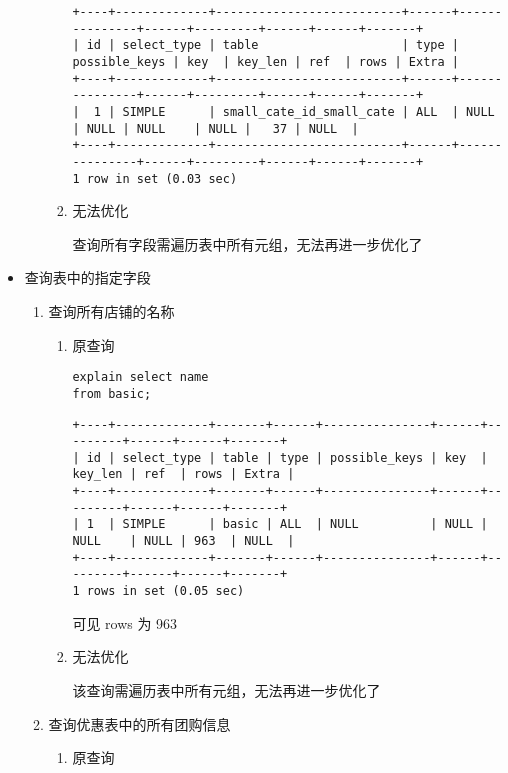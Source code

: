 \documentclass[11pt]{article}
\begin{document}
\begin{itemize}
\begin{enumerate}
\begin{enumerate}
\begin{verbatim}
+----+-------------+--------------------------+------+---------------+------+---------+------+------+-------+
| id | select_type | table                    | type | possible_keys | key  | key_len | ref  | rows | Extra |
+----+-------------+--------------------------+------+---------------+------+---------+------+------+-------+
|  1 | SIMPLE      | small_cate_id_small_cate | ALL  | NULL          | NULL | NULL    | NULL |   37 | NULL  |
+----+-------------+--------------------------+------+---------------+------+---------+------+------+-------+
1 row in set (0.03 sec)
\end{verbatim}

\item 无法优化

查询所有字段需遍历表中所有元组，无法再进一步优化了
\end{enumerate}
\end{enumerate}
\item 查询表中的指定字段
\label{sec-3-2-1-2}
\begin{enumerate}
\item 查询所有店铺的名称
\begin{enumerate}
\item 原查询

\begin{lstlisting}
explain select name
from basic;
\end{lstlisting}

\begin{verbatim}
+----+-------------+-------+------+---------------+------+---------+------+------+-------+
| id | select_type | table | type | possible_keys | key  | key_len | ref  | rows | Extra |
+----+-------------+-------+------+---------------+------+---------+------+------+-------+
| 1  | SIMPLE      | basic | ALL  | NULL          | NULL | NULL    | NULL | 963  | NULL  |
+----+-------------+-------+------+---------------+------+---------+------+------+-------+
1 rows in set (0.05 sec)
\end{verbatim}

可见 rows 为 963

\item 无法优化

该查询需遍历表中所有元组，无法再进一步优化了
\end{enumerate}

\item 查询优惠表中的所有团购信息
\begin{enumerate}
\item 原查询


\end{enumerate}
\end{enumerate}
\end{itemize}
\end{document}
